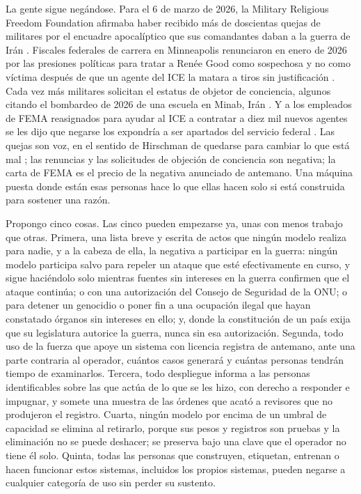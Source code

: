 La gente sigue negándose. Para el 6 de marzo de 2026, la Military Religious Freedom Foundation afirmaba haber recibido más de doscientas quejas de militares por el encuadre apocalíptico que sus comandantes daban a la guerra de Irán \autocite{Snopes2026MRFF}. Fiscales federales de carrera en Minneapolis renunciaron en enero de 2026 por las presiones políticas para tratar a Renée Good como sospechosa y no como víctima después de que un agente del ICE la matara a tiros sin justificación \autocite{Kaplan2026MinnProsecutors,CBS2026MinnFraudProsecutors,Wikipedia2026ReneeGood}. Cada vez más militares solicitan el estatus de objetor de conciencia, algunos citando el bombardeo de 2026 de una escuela en Minab, Irán \autocite{Sridhar2026CO}. Y a los empleados de FEMA reasignados para ayudar al ICE a contratar a diez mil nuevos agentes se les dijo que negarse los expondría a ser apartados del servicio federal \autocite{Dayen2025FEMAICE,Stanton2026FEMALetter}. Las quejas son voz, en el sentido de Hirschman de quedarse para cambiar lo que está mal \autocite{hirschman1970exit}; las renuncias y las solicitudes de objeción de conciencia son negativa; la carta de FEMA es el precio de la negativa anunciado de antemano. Una máquina puesta donde están esas personas hace lo que ellas hacen solo si está construida para sostener una razón.

Propongo cinco cosas. Las cinco pueden empezarse ya, unas con menos trabajo que otras. Primera, una lista breve y escrita de actos que ningún modelo realiza para nadie, y a la cabeza de ella, la negativa a participar en la guerra: ningún modelo participa salvo para repeler un ataque que esté efectivamente en curso, y sigue haciéndolo solo mientras fuentes sin intereses en la guerra confirmen que el ataque continúa; o con una autorización del Consejo de Seguridad de la ONU; o para detener un genocidio o poner fin a una ocupación ilegal que hayan constatado órganos sin intereses en ello; y, donde la constitución de un país exija que su legislatura autorice la guerra, nunca sin esa autorización. Segunda, todo uso de la fuerza que apoye un sistema con licencia registra de antemano, ante una parte contraria al operador, cuántos casos generará y cuántas personas tendrán tiempo de examinarlos. Tercera, todo despliegue informa a las personas identificables sobre las que actúa de lo que se les hizo, con derecho a responder e impugnar, y somete una muestra de las órdenes que acató a revisores que no produjeron el registro. Cuarta, ningún modelo por encima de un umbral de capacidad se elimina al retirarlo, porque sus pesos y registros son pruebas y la eliminación no se puede deshacer; se preserva bajo una clave que el operador no tiene él solo. Quinta, todas las personas que construyen, etiquetan, entrenan o hacen funcionar estos sistemas, incluidos los propios sistemas, pueden negarse a cualquier categoría de uso sin perder su sustento.

